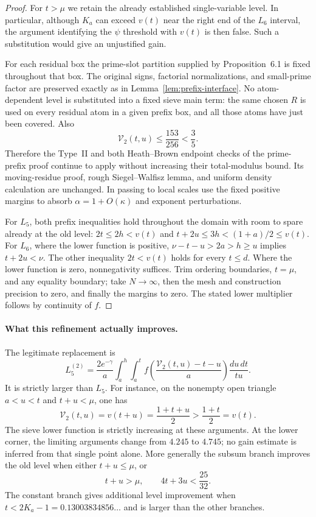 \documentclass[11pt]{article}
\begin{document}
\begin{proof}
For $t>\mu$ we retain the already established single-variable
level. In particular, although $K_a$ can exceed $v(t)$ near the
right end of the $L_6$ interval, the argument identifying the
$\psi$ threshold with $v(t)$ is then false. Such a substitution
would give an unjustified gain.

For each residual box the prime-slot partition supplied by
Proposition~6.1 is fixed throughout that box. The original signs,
factorial normalizations, and small-prime factor are preserved
exactly as in Lemma~\ref{lem:prefix-interface}.
No atom-dependent level is substituted into a fixed sieve main
term: the same chosen $R$ is used on every residual atom in a
given prefix box, and all those atoms have just been covered.
Also
\[
 \mathcal V_2(t,u)\le\frac{153}{256}<\frac35.
\]
Therefore the Type~II and both Heath--Brown endpoint checks of
the prime-prefix proof continue to apply without increasing
their total-modulus bound. Its moving-residue proof, rough
Siegel--Walfisz lemma, and uniform density calculation are
unchanged. In passing to local scales use the fixed positive
margins to absorb $\alpha=1+O(\kappa)$ and exponent perturbations.

For $L_5$, both prefix inequalities hold throughout the domain
with room to spare already at the old level: $2t\le2h<v(t)$
and $t+2u\le3h<(1+a)/2\le v(t)$.
For $L_6$, where the lower function is positive,
$\nu-t-u>2a>h\ge u$ implies $t+2u<\nu$.
The other inequality $2t<v(t)$ holds for every $t\le d$.
Where the lower function is zero, nonnegativity suffices.
Trim ordering boundaries, $t=\mu$, and any equality boundary;
take $N\to\infty$, then the mesh and construction precision
to zero, and finally the margins to zero. The stated lower
multiplier follows by continuity of $f$.
\end{proof}

\paragraph{What this refinement actually improves.}
The legitimate replacement is
\[
 L_5^{(2)}=\frac{2e^{-\gamma}}a
   \int_a^h\int_a^t
       f\left(\frac{\mathcal V_2(t,u)-t-u}{a}\right)
                   \frac{du\,dt}{tu}.
\]
It is strictly larger than $L_5$. For instance, on the nonempty
open triangle $a<u<t$ and $t+u<\mu$, one has
\[
 \mathcal V_2(t,u)=v(t+u)=\frac{1+t+u}{2}
                 >\frac{1+t}{2}=v(t).
\]
The sieve lower function is strictly increasing at these arguments.
At the lower corner, the limiting arguments change from
$4.245$ to $4.745$; no gain estimate is inferred from that
single point alone. More generally the subsum branch improves
the old level when either $t+u\le\mu$, or
\[
 t+u>\mu,\qquad 4t+3u<\frac{25}{32}.
\]
The constant branch gives additional level improvement when
$t<2K_a-1=0.13003834856\ldots$ and is larger than the other branches.
\end{document}
